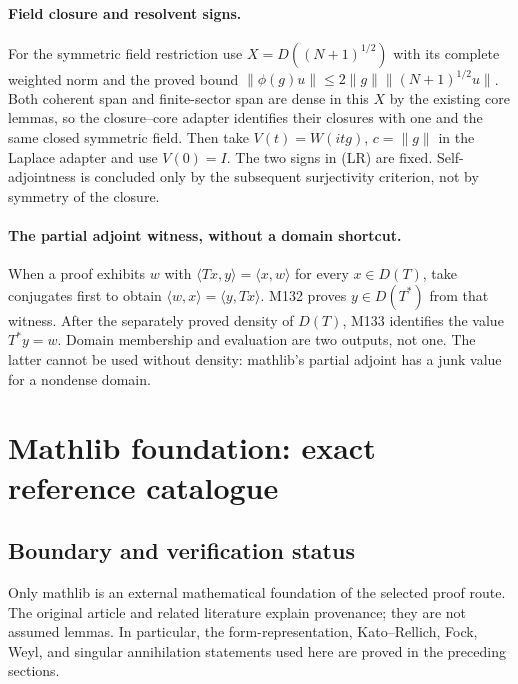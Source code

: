 \documentclass[11pt,a4paper]{article}
\theoremstyle{definition}
\theoremstyle{remark}
\begin{document}
\paragraph{Field closure and resolvent signs.}
For the symmetric field restriction use
$X=D((N+1)^{1/2})$ with its complete weighted norm and the proved bound
$\|\phi(g)u\|\leq2\|g\|\|(N+1)^{1/2}u\|$.
Both coherent span and finite-sector span are dense in this $X$ by the
existing core lemmas, so the closure--core adapter identifies their
closures with one and the same closed symmetric field. Then take
$V(t)=W(itg)$, $c=\|g\|$ in the Laplace adapter and use $V(0)=I$.
The two signs in (LR) are fixed. Self-adjointness is concluded only
by the subsequent surjectivity criterion, not by symmetry of the closure.

\paragraph{The partial adjoint witness, without a domain shortcut.}
When a proof exhibits $w$ with
$\langle Tx,y\rangle=\langle x,w\rangle$ for every $x\in D(T)$,
take conjugates first to obtain
$\langle w,x\rangle=\langle y,Tx\rangle$.
M132 proves $y\in D(T^*)$ from that witness.
After the separately proved density of $D(T)$, M133 identifies the
value $T^*y=w$. Domain membership and evaluation are two outputs, not
one. The latter cannot be used without density: mathlib's partial
adjoint has a junk value for a nondense domain.


\section{Mathlib foundation: exact reference catalogue}
\label{sec:mathlib-audit}\label{audit:boundary}\label{audit:method}\label{audit:base}
\label{sec:mathlib-access}
\subsection{Boundary and verification status}
Only mathlib is an external mathematical foundation of the selected proof
route. The original article and related literature explain provenance;
they are not assumed lemmas. In particular, the form-representation,
Kato--Rellich, Fock, Weyl, and singular annihilation statements used here
are proved in the preceding sections.
\end{document}
